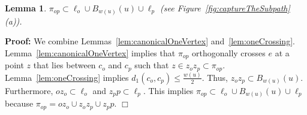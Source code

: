 \documentclass[a4paper,11pt]{article}
\newtheorem{lemma}{Lemma}
\newenvironment{proof}{\textbf{Proof:}}{\hspace*{0mm}\hfill\ensuremath{\Box}}
\begin{document}
\begin{lemma}\label{lem:shortestPathOneCrossing}
	$\pi_{op} \subset \ell_o \cup B_{w(u)}(u) \cup \ell_p$ (see Figure~\ref{fig:captureTheSubpath}(a)).
\end{lemma} 
\begin{proof}
	We combine Lemmas~\ref{lem:canonicalOneVertex} and~\ref{lem:oneCrossing}. Lemma~\ref{lem:canonicalOneVertex} implies that $\pi_{op}$ orthogonally crosses $e$   at a point $z$ that lies between $c_o$ and $c_p$ such that $z \in z_oz_p \subset \pi_{op}$. Lemma~\ref{lem:oneCrossing} implies $d_1(c_o,c_p)\leq\frac{w(u)}{2}$. Thus, $z_oz_p \subset B_{w(u)}(u)$. Furthermore, $oz_o \subset \ell_o$ and $z_pp \subset \ell_p$. This implies $\pi_{op} \subset  \ell_o \cup B_{w(u)}(u) \cup \ell_p$ because $\pi_{op} = oz_o \cup z_oz_p \cup z_pp$.
\end{proof}
\end{document}
